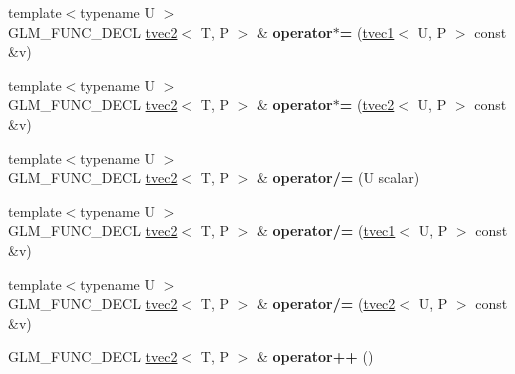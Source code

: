 \begin{DoxyCompactItemize}
\item 
\mbox{\label{structglm_1_1tvec2_a750b6e459213cd75ca333054f188779f}} 
{\footnotesize template$<$typename U $>$ }\\G\+L\+M\+\_\+\+F\+U\+N\+C\+\_\+\+D\+E\+CL \hyperlink{structglm_1_1tvec2}{tvec2}$<$ T, P $>$ \& {\bfseries operator$\ast$=} (\hyperlink{structglm_1_1tvec1}{tvec1}$<$ U, P $>$ const \&v)
\item 
\mbox{\label{structglm_1_1tvec2_aa9e3fea6b7122af79c1fa65fc66c1170}} 
{\footnotesize template$<$typename U $>$ }\\G\+L\+M\+\_\+\+F\+U\+N\+C\+\_\+\+D\+E\+CL \hyperlink{structglm_1_1tvec2}{tvec2}$<$ T, P $>$ \& {\bfseries operator$\ast$=} (\hyperlink{structglm_1_1tvec2}{tvec2}$<$ U, P $>$ const \&v)
\item 
\mbox{\label{structglm_1_1tvec2_ae917fca6ea5283f763f1887f778a6ded}} 
{\footnotesize template$<$typename U $>$ }\\G\+L\+M\+\_\+\+F\+U\+N\+C\+\_\+\+D\+E\+CL \hyperlink{structglm_1_1tvec2}{tvec2}$<$ T, P $>$ \& {\bfseries operator/=} (U scalar)
\item 
\mbox{\label{structglm_1_1tvec2_a4e8369479212934e679d59357f82db7b}} 
{\footnotesize template$<$typename U $>$ }\\G\+L\+M\+\_\+\+F\+U\+N\+C\+\_\+\+D\+E\+CL \hyperlink{structglm_1_1tvec2}{tvec2}$<$ T, P $>$ \& {\bfseries operator/=} (\hyperlink{structglm_1_1tvec1}{tvec1}$<$ U, P $>$ const \&v)
\item 
\mbox{\label{structglm_1_1tvec2_a42e14ad86fc32cc36ba3a512cd638585}} 
{\footnotesize template$<$typename U $>$ }\\G\+L\+M\+\_\+\+F\+U\+N\+C\+\_\+\+D\+E\+CL \hyperlink{structglm_1_1tvec2}{tvec2}$<$ T, P $>$ \& {\bfseries operator/=} (\hyperlink{structglm_1_1tvec2}{tvec2}$<$ U, P $>$ const \&v)
\item 
\mbox{\label{structglm_1_1tvec2_aee5dc4593579348b1f53ce6296337702}} 
G\+L\+M\+\_\+\+F\+U\+N\+C\+\_\+\+D\+E\+CL \hyperlink{structglm_1_1tvec2}{tvec2}$<$ T, P $>$ \& {\bfseries operator++} ()
\item 
\mbox{\label{structglm_1_1tvec2_af751da3c19f0f22f8eb2bac9003f9384}} 

\end{DoxyCompactItemize}

